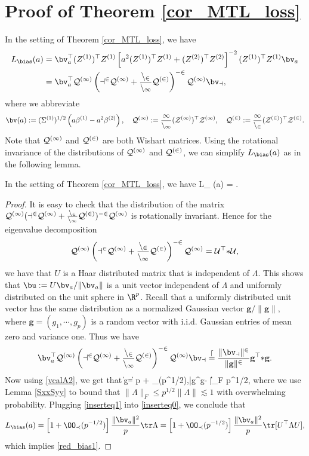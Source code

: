 \documentclass[aos,preprint]{imsart}
\begin{document}
\section{Proof of Theorem \ref{cor_MTL_loss}}\label{app_iso_cov}
In the setting of Theorem \ref{cor_MTL_loss}, we have 
\begin{align*}
L_{\bias} (a)&=\bv_a^\top (Z^{(1)})^\top Z^{(1)} \left[a^2(Z^{(1)})^\top Z^{(1)}+ (Z^{(2)})^\top Z^{(2)}\right]^{-2 }  (Z^{(1)})^\top Z^{(1)} \bv_a\\
&=\bv_a^\top \cal Q^{(1)} \left(a^2\cal Q^{(1)}+ \frac{n_2}{n_1}\cal Q^{(2)}\right)^{-2 } \cal Q^{(1)} \bv_a,
\end{align*}
where we abbreviate  
$$\bv(a):=(\Sigma^{(1)})^{1/2}\left(a\beta^{(1)}- a^2\beta^{(2)}\right), \quad \cal Q^{(1)}: = \frac1{n_1}(Z^{(1)})^\top Z^{(1)},\quad \cal Q^{(2)}: = \frac1{n_2}(Z^{(2)})^\top Z^{(2)}.$$
Note that $\cal Q^{(1)}$ and $\cal Q^{(2)}$ are both Wishart matrices. Using the rotational invariance of the distributions of $\cal Q^{(1)}$ and $\cal Q^{(2)}$, we can simplify $L_{\bias}(a)$ as in the following lemma.

\begin{lemma}\label{claim_reduce_rota}
In the setting of Theorem \ref{cor_MTL_loss}, we have 
\be\label{red_bias1}L_{\bias} (a) =  .\ee
\end{lemma}
\begin{proof}
It is easy to check that the distribution of the matrix $\cal Q^{(1)} (a^2\cal Q^{(1)}+ \frac{n_2}{n_1}\cal Q^{(2)})^{-2 } \cal Q^{(1)}$ is rotationally invariant. Hence for the eigenvalue decomposition 
$$\cal Q^{(1)} \left(a^2\cal Q^{(1)}+ \frac{n_2}{n_1}\cal Q^{(2)}\right)^{-2 } \cal Q^{(1)}= U^\top \Lambda U,$$
we have that $U$ is a Haar distributed matrix that is independent of $\Lambda$. This shows that $\bu:=U\bv_a/\|\bv_a\|$ is a unit vector independent of $\Lambda$ and uniformly distributed on the unit sphere in $\R^p$. Recall that a uniformly distributed unit vector has the same distribution as a normalized Gaussian vector ${\mathbf g}/{\|\mathbf g\|},$ where $\mathbf g=(g_1,\cdots, g_p)$ is a random vector with i.i.d. Gaussian entries of mean zero and variance one. Thus we have 
\begin{align}\label{inserteq0}
\bv_a^\top \cal Q^{(1)} \left(a^2\cal Q^{(1)}+ \frac{n_2}{n_1}\cal Q^{(2)}\right)^{-2 } \cal Q^{(1)} \bv_a \stackrel{d}{=} \frac{\|\bv_a\|^2}{\|\mathbf g\|^2} \mathbf g^\top \Lambda \mathbf g. 
\end{align}
Now using \eqref{vcalA2}, we get that 
\be\label{inserteq1}\|\mathbf g\| = p + \OO_\prec (p^{1/2}),\quad |\mathbf g^\top \Lambda \mathbf g- \tr \Lambda|\prec \|\Lambda\|_F \prec p^{1/2},\ee
where we use Lemma \ref{SxxSyy} to bound that $\|\Lambda\|_F\le p^{1/2}\|\Lambda\|\lesssim 1$ with overwhelming probability. Plugging \eqref{inserteq1} into \eqref{inserteq0}, we conclude that  
$$L_{\bias}(a) = \left[ 1+\OO_\prec(p^{-1/2})\right] \frac{\|\bv_a\|^2}{p}\tr \Lambda=  \left[ 1+\OO_\prec(p^{-1/2})\right] \frac{\|\bv_a\|^2}{p}\tr [U^\top \Lambda U],$$
which implies \eqref{red_bias1}.  
\end{proof}
\end{document}
